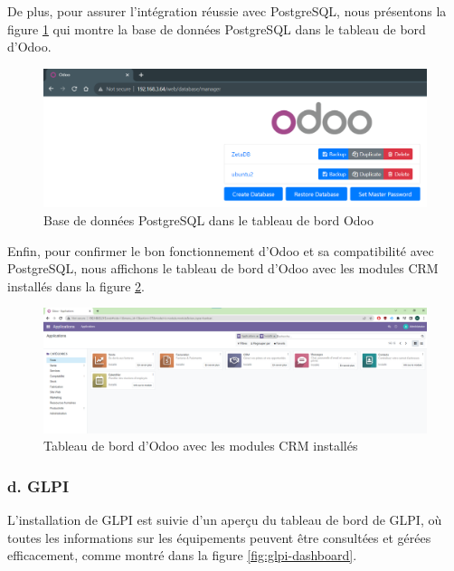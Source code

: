 De plus, pour assurer l'intégration réussie avec PostgreSQL, nous présentons la figure \ref{fig:Dashboard-Odoo-DB} qui montre la base de données PostgreSQL dans le tableau de bord d'Odoo.

\begin{figure}[H]
\centering
\includegraphics[width=15cm]{Images/104614.png}
\caption{Base de données PostgreSQL dans le tableau de bord Odoo}
\label{fig:Dashboard-Odoo-DB}
\end{figure}

Enfin, pour confirmer le bon fonctionnement d'Odoo et sa compatibilité avec PostgreSQL, nous affichons le tableau de bord d'Odoo avec les modules CRM installés dans la figure \ref{fig:odoo-dashboard}.

\begin{figure}[H]
\centering
\includegraphics[width=15cm]{Images/OdooServer2.png}
\caption{Tableau de bord d'Odoo avec les modules CRM installés}
\label{fig:odoo-dashboard}
\end{figure}



\subsubsection{d. GLPI}

L'installation de GLPI \cite{glpi-install-tecmint} est suivie d'un aperçu du tableau de bord de GLPI, où toutes les informations sur les équipements peuvent être consultées et gérées efficacement, comme montré dans la figure \ref{fig:glpi-dashboard}.


